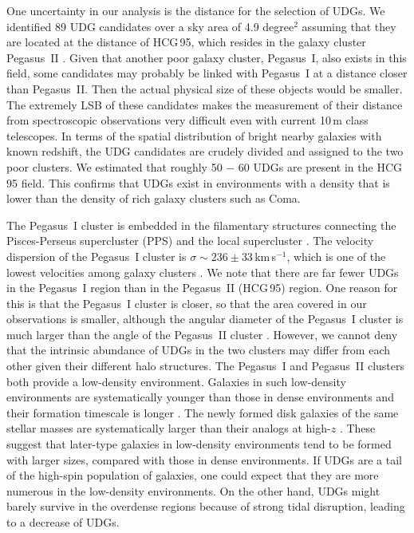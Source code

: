 \documentclass[twocolumn,trackchanges]{aastex61}
\begin{document}
One uncertainty in our analysis is the distance for the selection of UDGs. We identified 89 UDG candidates over a sky area of 4.9 degree$^2$ assuming that they are located at the distance of HCG\,95, which resides in the galaxy cluster Pegasus~II \citep{Rood1994}. Given that another poor galaxy cluster, Pegasus~I, also exists in this field, some candidates may probably be linked with Pegasus~I at a distance closer than Pegasus~II. Then the actual physical size of these objects would be smaller. The extremely LSB of these candidates makes the measurement of their distance from spectroscopic observations very difficult even with current 10\,m class telescopes.  In terms of the spatial distribution of bright nearby galaxies with known redshift, the UDG candidates are crudely divided and assigned to the two poor clusters.  We estimated that roughly 50 $-$ 60 UDGs are present in the HCG\,95 field.  This confirms that UDGs exist in environments with a density that is lower than the density of rich galaxy clusters such as Coma. 


The Pegasus~I cluster is embedded in the filamentary structures connecting the  Pisces-Perseus supercluster (PPS) and the local supercluster \citep{Richter1982,Levy2007}. The velocity dispersion  of the Pegasus~I cluster  is $\sigma \sim 236\pm33$\,km\,s$^{-1}$, which is one of the lowest velocities among galaxy clusters \citep{Noonan1981,Richter1982}.  We note that there are far fewer UDGs in the Pegasus~I region than in the Pegasus~II (HCG\,95) region. One reason for this is that the Pegasus~I cluster is closer, so that the area covered in our observations is smaller, although the angular diameter of the Pegasus~I cluster is much larger than the angle of the Pegasus~II cluster \citep{Chincarini1976}.  However, we cannot deny that the intrinsic abundance of UDGs in the two clusters may differ from each other given their different halo structures. 
%
The Pegasus~I and Pegasus~II clusters both provide a low-density environment. Galaxies in such low-density environments are systematically younger than those in dense environments and their formation timescale is  longer \citep{Thomas05}.  The newly formed disk galaxies of the same stellar masses are systematically larger than their analogs at high-$z$ \citep{vanderWel2014}. These suggest that later-type galaxies  in low-density environments  tend to be formed with larger sizes, compared with those in dense environments. If UDGs are a tail of the high-spin  population of galaxies, one could expect that they are more numerous in  the low-density environments. On the other hand, UDGs might barely survive in the overdense regions because of strong tidal disruption, leading to a decrease of UDGs.  
 
\end{document}
